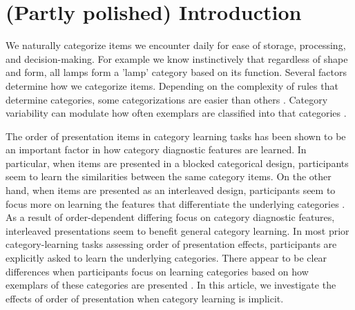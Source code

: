 \section{(Partly polished) Introduction}

We naturally categorize items we encounter daily for ease of storage, processing, and decision-making. For example we know instinctively that regardless of shape and form, all lamps form a 'lamp' category based on its function. Several factors determine how we categorize items. Depending on the complexity of rules that determine categories, some categorizations are easier than others \cite{shepard1961learning, nosofsky1994comparing}. Category variability can modulate how often exemplars are classified into that categories \cite{cohen2001category}.

The order of presentation items in category learning tasks has been shown to be an important factor in how category diagnostic features are learned. In particular, when items are presented in a blocked categorical design, participants seem to learn the similarities between the same category items. On the other hand, when items are presented as an interleaved design, participants seem to focus more on learning the features that differentiate the underlying categories \cite{carvalho2017sequence}. As a result of order-dependent differing focus on category diagnostic features, interleaved presentations seem to benefit general category learning. In most prior category-learning tasks assessing order of presentation effects, participants are explicitly asked to learn the underlying categories. There appear to be clear differences when participants focus on learning categories based on how exemplars of these categories are presented \cite{kornell2008learning, kornell2010spacing, whitehead2021transfer, vlach2008spacing, carvalho2014putting, carvalho2017sequence}. In this article, we investigate the effects of order of presentation when category learning is implicit. 

